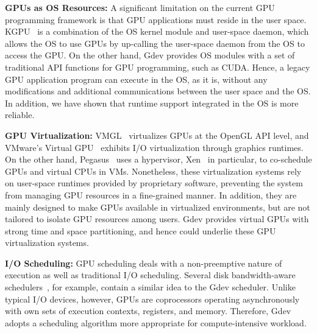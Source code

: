\begin{comment}
Comparisons of Gdev and representatives of the above GPU resource
management approaches are summarized in Table~\ref{tab:related_work}.
\begin{table*}[t]
 \caption{Comparisons of Gdev and prior GPU resource management
 approaches.}
 \label{tab:related_work}
 \begin{center}
  {\sf
  \begin{tabular}{|l|p{12.8cm}|}
   \hline
   \hline
  \end{tabular}
  }
 \end{center}
\vspace{-1em}
\end{table*}
\end{comment}

\textbf{GPUs as OS Resources:}
A significant limitation on the current GPU programming framework is
that GPU applications must reside in the user space.
KGPU~\cite{Sun_SYSTOR12} is a combination of the OS kernel
module and user-space daemon, which allows the OS to use GPUs by
up-calling the user-space daemon from the OS to access the GPU.
On the other hand, Gdev provides OS modules with a set of traditional
API functions for GPU programming, such as CUDA.
Hence, a legacy GPU application program can execute in the OS, as it is,
without any modifications and additional communications between the user
space and the OS.
In addition, we have shown that runtime support integrated in the OS is
more reliable.

\textbf{GPU Virtualization:}
VMGL~\cite{Lagar-Cavilla_VEE07} virtualizes GPUs at the OpenGL
API level, and VMware's Virtual GPU~\cite{Dowty_SIGOPS09} exhibits I/O
virtualization through graphics runtimes.
On the other hand, Pegasus~\cite{Gupta_ATC11} uses a hypervisor,
Xen~\cite{Barham_SOSP03} in particular, to co-schedule GPUs and virtual
CPUs in VMs.
Nonetheless, these virtualization systems rely on user-space runtimes
provided by proprietary software, preventing the system from managing
GPU resources in a fine-grained manner. 
In addition, they are mainly designed to make GPUs available in
virtualized environments, but are not tailored to isolate GPU resources
among users.
Gdev provides virtual GPUs with strong time and space partitioning, and
hence could underlie these GPU virtualization systems.

\textbf{I/O Scheduling:}
GPU scheduling deals with a non-preemptive nature of execution as well
as traditional I/O scheduling.
Several disk bandwidth-aware schedulers~\cite{Gulati_FAST09,
Povzner_EUROSYS08, Wang_FAST07}, for example, contain a similar idea to
the Gdev scheduler.
Unlike typical I/O devices, however, GPUs are coprocessors operating
asynchronously with own sets of execution contexts, registers, and memory.
Therefore, Gdev adopts a scheduling algorithm more appropriate for
compute-intensive workload.


